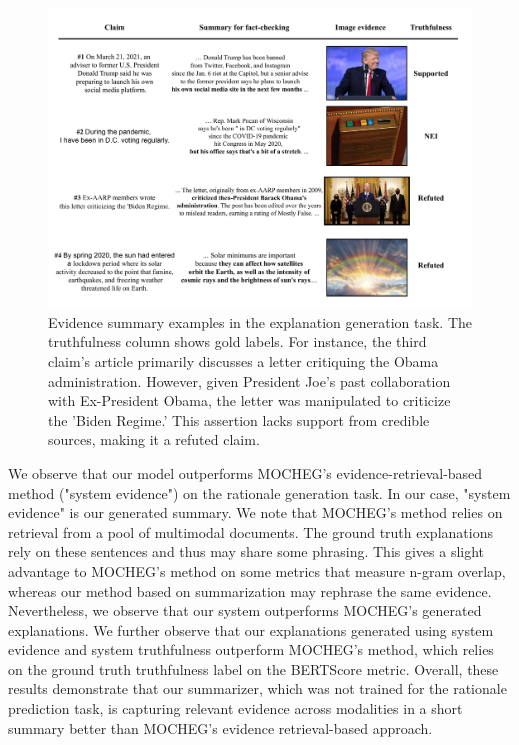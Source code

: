 \begin{figure}[th]
  \centering
\includegraphics[width=\textwidth,height=\textwidth,keepaspectratio]{images/multimodal-fact-checking.pdf}
  \caption{Evidence summary examples in the explanation generation task. The truthfulness column shows gold labels. For instance, the third claim's article primarily discusses a letter critiquing the Obama administration. However, given President Joe's past collaboration with Ex-President Obama, the letter was manipulated to criticize the 'Biden Regime.' This assertion lacks support from credible sources, making it a refuted claim.}
  \label{fig:qualitative}
\end{figure}

We observe that our model outperforms MOCHEG's evidence-retrieval-based method ("system evidence") on the rationale generation task. In our case, "system evidence" is our generated summary. We note that MOCHEG's method relies on retrieval from a pool of multimodal documents. The ground truth explanations rely on these sentences and thus may share some phrasing. This gives a slight advantage to MOCHEG's method on some metrics that measure n-gram overlap, whereas our method based on summarization may rephrase the same evidence. Nevertheless, we observe that our system outperforms MOCHEG's generated explanations. We further observe that our explanations generated using system evidence and system truthfulness outperform MOCHEG's method, which relies on the ground truth truthfulness label on the BERTScore metric. Overall, these results demonstrate that our summarizer, which was not trained for the rationale prediction task, is capturing relevant evidence across modalities in a short summary better than MOCHEG's evidence retrieval-based approach.

